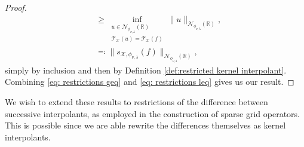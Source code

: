 \documentclass[pdflatex,sn-mathphys-num]{sn-jnl}%
\theoremstyle{thmstyleone}%
\theoremstyle{thmstyletwo}%
\theoremstyle{thmstylethree}%
\begin{document}
\begin{proof}
\begin{align}
        &\geq\inf_{\substack{u\in\mathcal{N}_{\phi_{\nu,\lambda}}(\mathbb{R})\nonumber\\
        \mathcal{T}_{\mathcal{X}}(u)=\mathcal{T}_{\mathcal{X}}(f)}} \|u\|_{\mathcal{N}_{\phi_{\nu,\lambda}}(\mathbb{R})},\nonumber\\
        &\eqqcolon\|s_{\mathcal{X},\phi_{\nu,\lambda}}(f)\|_{\mathcal{N}_{\phi_{\nu,\lambda}}(\mathbb{R})},\label{eq: restrictions leq}
    \end{align}
    simply by inclusion and then by Definition \ref{def:restricted kernel interpolant}. Combining \eqref{eq: restrictions geq} and \eqref{eq: restrictions leq} gives us our result.
\end{proof}

We wish to extend these results to restrictions of the difference between successive interpolants, as employed in the construction of sparse grid operators. 
This is possible since we are able rewrite the differences themselves as kernel interpolants.
\end{document}
